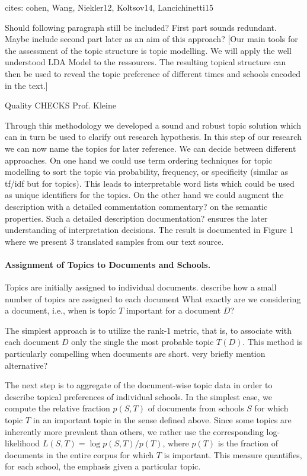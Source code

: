 \documentclass[a4paper,10pt]{article}
\newcommand{\TODO}[1]{\begingroup\color{red}#1\endgroup}
\newcommand{\PFS}[1]{\begingroup\color{blue}#1\endgroup}
\newcommand{\NR}[1]{\begingroup\color{orange}#1\endgroup}
\begin{document}
\TODO{cites: cohen, Wang, Niekler12, Koltsov14, Lancichinetti15}



\TODO{Should following paragraph still be included?} \NR{First part sounds 
redundant. Maybe include second part later as an aim of this approach?}
  [Our main tools for the assessment of the topic structure is topic
  modelling.  We will apply the well understood LDA Model to
  the ressources. The resulting topical structure can then be used to
  reveal the topic preference of different times and \TODO{schools} encoded
  in the text.]


Quality CHECKS Prof. Kleine

Through this methodology we developed a sound and robust topic solution
which can in turn be used to clarify out research hypothesis.
In this step of our research we can now name
the topics for later reference. We can decide between different approaches. On one hand 
we could use term ordering techniques for topic modelling to sort the topic via 
probability, frequency, or specificity (similar as tf/idf but for topics). This leads to 
interpretable word lists which could be used as unique identifiers for the topics. On
the other hand we could augment the description with a detailed commentation \NR{commentary?} on the 
semantic properties. Such a detailed description \NR{documentation?} ensures the later understanding of 
interpretation decisions. The result is documented in \TODO{Figure 1} where we present 3 
translated samples from our text source.


\paragraph{Assignment of Topics to Documents and Schools.} 

\PFS{Topics are initially assigned to individual documents.}
\TODO{describe how a small number of topics are assigned to each document
  What exactly are we considering a document, i.e., when is topic $T$ 
  important for a document $D$?} 

The simplest approach is to utilize the rank-1 metric, that is, to
associate with each document $D$ only the single the most probable topic
$T(D)$. This method is particularly compelling when documents are short. 
\TODO{very briefly mention alternative?}

The next step is to aggregate of the document-wise topic data in order to
describe topical preferences of individual schools.  In the simplest case,
we compute the relative fraction $p(S,T)$ of documents from schools $S$ for
which topic $T$ in an important topic in the sense defined above.  Since
some topics are inherently more prevalent than others, we rather use the
corresponding log-likelihood $L(S,T) = \log p(S,T)/p(T)$, where $p(T)$ is
the fraction of documents in the entire corpus for which $T$ is
important. This measure quantifies, for each \TODO{school}, the emphasis
given a particular topic.
\end{document}
